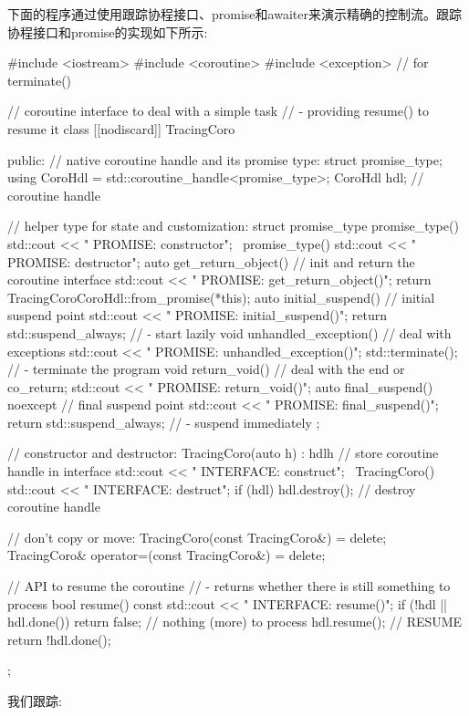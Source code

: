 下面的程序通过使用跟踪协程接口、promise和awaiter来演示精确的控制流。跟踪协程接口和promise的实现如下所示:


\begin{cpp}
#include <iostream>
#include <coroutine>
#include <exception> // for terminate()

// coroutine interface to deal with a simple task
// - providing resume() to resume it
class [[nodiscard]] TracingCoro {
	public:
	// native coroutine handle and its promise type:
	struct promise_type;
	using CoroHdl = std::coroutine_handle<promise_type>;
	CoroHdl hdl; // coroutine handle
	
	// helper type for state and customization:
	struct promise_type {
		promise_type() {
			std::cout << " PROMISE: constructor\n";
		}
		~promise_type() {
			std::cout << " PROMISE: destructor\n";
		}
		auto get_return_object() { // init and return the coroutine interface
			std::cout << " PROMISE: get_return_object()\n";
			return TracingCoro{CoroHdl::from_promise(*this)};
		}
		auto initial_suspend() { // initial suspend point
			std::cout << " PROMISE: initial_suspend()\n";
			return std::suspend_always{}; // - start lazily
		}
		void unhandled_exception() { // deal with exceptions
			std::cout << " PROMISE: unhandled_exception()\n";
			std::terminate(); // - terminate the program
		}
		void return_void() { // deal with the end or co_return;
			std::cout << " PROMISE: return_void()\n";
		}
		auto final_suspend() noexcept { // final suspend point
			std::cout << " PROMISE: final_suspend()\n";
			return std::suspend_always{}; // - suspend immediately
		}
	};
	
	// constructor and destructor:
	TracingCoro(auto h)
	: hdl{h} { // store coroutine handle in interface
	std::cout << " INTERFACE: construct\n";
	}
	~TracingCoro() {
		std::cout << " INTERFACE: destruct\n";
		if (hdl) {
			hdl.destroy(); // destroy coroutine handle
		}
	}
	
	// don’t copy or move:
	TracingCoro(const TracingCoro&) = delete;
	TracingCoro& operator=(const TracingCoro&) = delete;
	
	// API to resume the coroutine
	// - returns whether there is still something to process
	bool resume() const {
		std::cout << " INTERFACE: resume()\n";
		if (!hdl || hdl.done()) {
			return false; // nothing (more) to process
		}
		hdl.resume(); // RESUME
		return !hdl.done();
	}
};
\end{cpp}

我们跟踪:

